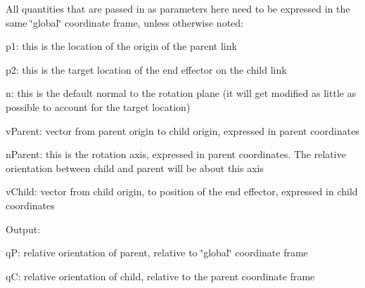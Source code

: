 \label{classCartWheel_1_1Core_1_1TwoLinkIK_a18d95e0099d3419cd6a1d7c34dd291a7}
All quantities that are passed in as parameters here need to be expressed in the same \char`\"{}global\char`\"{} coordinate frame, unless otherwise noted:
\begin{DoxyItemize}
\item p1: this is the location of the origin of the parent link
\item p2: this is the target location of the end effector on the child link
\item n: this is the default normal to the rotation plane (it will get modified as little as possible to account for the target location)
\end{DoxyItemize}


\begin{DoxyItemize}
\item vParent: vector from parent origin to child origin, expressed in parent coordinates
\item nParent: this is the rotation axis, expressed in parent coordinates. The relative orientation between child and parent will be about this axis
\item vChild: vector from child origin, to position of the end effector, expressed in child coordinates
\end{DoxyItemize}

Output:
\begin{DoxyItemize}
\item qP: relative orientation of parent, relative to \char`\"{}global\char`\"{} coordinate frame
\item qC: relative orientation of child, relative to the parent coordinate frame
\end{DoxyItemize}

